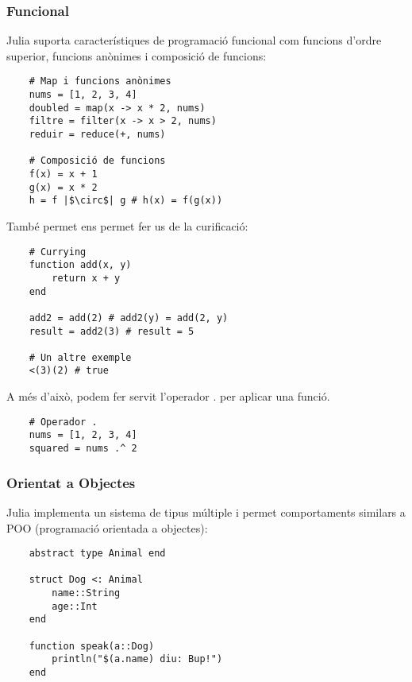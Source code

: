 \documentclass[a4paper]{article}
\begin{document}
\subsubsection{Funcional}
Julia suporta característiques de programació funcional com funcions d'ordre superior, funcions anònimes i composició de funcions:

\begin{verbatim}
    # Map i funcions anònimes
    nums = [1, 2, 3, 4]
    doubled = map(x -> x * 2, nums)
    filtre = filter(x -> x > 2, nums)
    reduir = reduce(+, nums)

    # Composició de funcions
    f(x) = x + 1
    g(x) = x * 2
    h = f |$\circ$| g # h(x) = f(g(x))
\end{verbatim}

També permet ens permet fer us de la curificació:
\begin{verbatim}
    # Currying
    function add(x, y)
        return x + y
    end

    add2 = add(2) # add2(y) = add(2, y)
    result = add2(3) # result = 5

    # Un altre exemple
    <(3)(2) # true
\end{verbatim}

A més d'això, podem fer servit l'operador . per aplicar una funció.
\begin{verbatim}
    # Operador .
    nums = [1, 2, 3, 4]
    squared = nums .^ 2
\end{verbatim}

\subsubsection{Orientat a Objectes}
Julia implementa un sistema de tipus múltiple i permet comportaments similars a POO (programació orientada a objectes):

\begin{verbatim}
    abstract type Animal end

    struct Dog <: Animal
        name::String
        age::Int
    end

    function speak(a::Dog)
        println("$(a.name) diu: Bup!")
    end
\end{verbatim}
\end{document}
